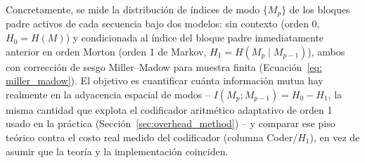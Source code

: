         Concretamente, se mide la distribución de índices de modo $\{M_p\}$ de los bloques padre
        activos de cada secuencia bajo dos modelos: sin contexto (orden 0, $H_0=H(M)$) y
        condicionada al índice del bloque padre inmediatamente anterior en orden Morton (orden 1
        de Markov, $H_1=H(M_p\mid M_{p-1})$), ambos con corrección de sesgo Miller--Madow para
        muestra finita (Ecuación~\ref{eq: miller_madow}). El objetivo es cuantificar cuánta
        información mutua hay realmente en la adyacencia espacial de modos --
        $I(M_p;M_{p-1})=H_0-H_1$, la misma cantidad que explota el codificador aritmético
        adaptativo de orden 1 usado en la práctica (Sección~\ref{sec:overhead_method}) -- y
        comparar ese piso teórico contra el costo real medido del codificador (columna
        Coder/$H_1$), en vez de asumir que la teoría y la implementación coinciden.


